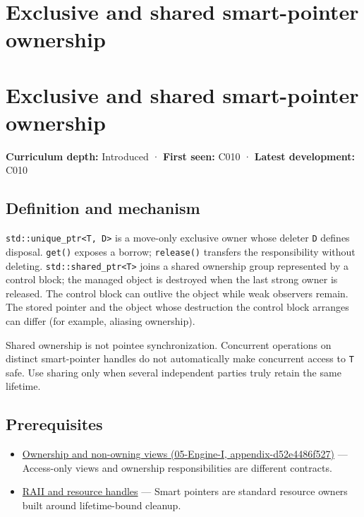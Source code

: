 \hypertarget{appendix-51602cabe815}{}
\section*{Exclusive and shared smart-pointer ownership}
\section{Exclusive and shared smart-pointer ownership}\label{exclusive-and-shared-smart-pointer-ownership}

\textbf{Curriculum depth:} Introduced · \textbf{First seen:} C010 · \textbf{Latest development:} C010

\subsection{Definition and mechanism}\label{definition-and-mechanism}

\texttt{std::unique\_ptr\textless{}T,\ D\textgreater{}} is a move-only exclusive owner whose deleter \texttt{D} defines disposal. \texttt{get()} exposes a borrow; \texttt{release()} transfers the responsibility without deleting. \texttt{std::shared\_ptr\textless{}T\textgreater{}} joins a shared ownership group represented by a control block; the managed object is destroyed when the last strong owner is released. The control block can outlive the object while weak observers remain. The stored pointer and the object whose destruction the control block arranges can differ (for example, aliasing ownership).

Shared ownership is not pointee synchronization. Concurrent operations on distinct smart-pointer handles do not automatically make concurrent access to \texttt{T} safe. Use sharing only when several independent parties truly retain the same lifetime.

\subsection{Prerequisites}\label{prerequisites}

\begin{itemize}
\tightlist
\item
  \href{}{Ownership and non-owning views (05-Engine-I, appendix-d52e4486f527)} --- Access-only views and ownership responsibilities are different contracts.
\item
  \hyperref[appendix-69739d3ab49b]{RAII and resource handles} --- Smart pointers are standard resource owners built around lifetime-bound cleanup.
\end{itemize}

